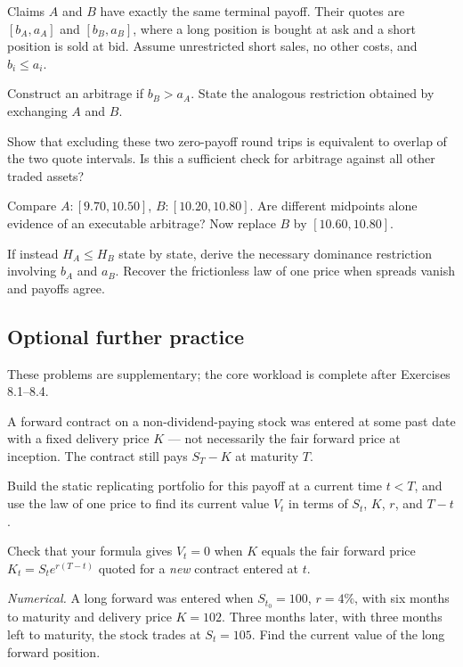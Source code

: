 \begin{exercise}
Claims \(A\) and \(B\) have exactly the same terminal payoff.
Their quotes are \([b_A,a_A]\) and \([b_B,a_B]\), where a long
position is bought at ask and a short position is sold at bid. Assume
unrestricted short sales, no other costs, and \(b_i\leq a_i\).
\begin{exparts}
\item Construct an arbitrage if \(b_B>a_A\). State the analogous restriction obtained by exchanging \(A\) and \(B\).
\item Show that excluding these two zero-payoff round trips is equivalent to overlap of the two quote intervals. Is this a sufficient check for arbitrage against all other traded assets?
\item Compare \(A:[9.70,10.50]\), \(B:[10.20,10.80]\). Are different midpoints alone evidence of an executable arbitrage? Now replace \(B\) by \([10.60,10.80]\).
\item If instead \(H_A\leq H_B\) state by state, derive the necessary dominance restriction involving \(b_A\) and \(a_B\). Recover the frictionless law of one price when spreads vanish and payoffs agree.
\end{exparts}
\end{exercise}
\fi

\ifIncludeFurther
{}
\subsection*{Optional further practice}
\noindent These problems are supplementary; the core workload is complete after Exercises 8.1--8.4.
\setcounter{exercise}{4}
\begin{exercise}
A forward contract on a non-dividend-paying stock was entered at some past
date with a fixed delivery price \(K\) --- not necessarily the fair forward
price at inception. The contract still pays \(S_T-K\) at maturity \(T\).
\begin{exparts}
  \item Build the static replicating portfolio for this payoff at a current
  time \(t<T\), and use the law of one price to find its current value
  \(V_t\) in terms of \(S_t\), \(K\), \(r\), and \(T-t\).
  \item Check that your formula gives \(V_t=0\) when \(K\) equals the fair
  forward price \(K_t=S_te^{r(T-t)}\) quoted for a \emph{new} contract entered
  at \(t\).
  \item \emph{Numerical.} A long forward was entered when \(S_{t_0}=100\),
  \(r=4\%\), with six months to maturity and delivery price \(K=102\).
  Three months later, with three months left to maturity, the stock trades
  at \(S_t=105\). Find the current value of the long forward position.
\end{exparts}
\end{exercise}
\fi
